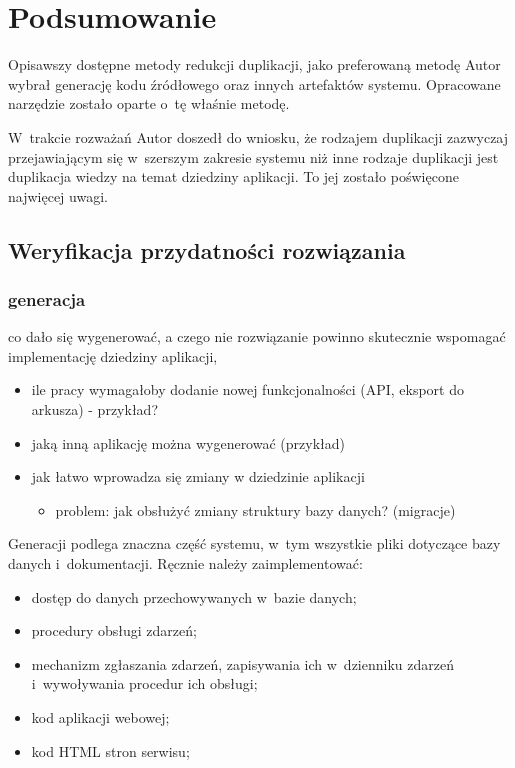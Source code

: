 \chapter{Podsumowanie} \label{chap:outro}

Opisawszy dostępne metody redukcji duplikacji, jako preferowaną metodę Autor wybrał generację kodu źródłowego oraz innych artefaktów systemu.
Opracowane narzędzie zostało oparte o~tę właśnie metodę.

W~trakcie rozważań Autor doszedł do wniosku, że rodzajem duplikacji zazwyczaj przejawiającym się w~szerszym zakresie systemu niż inne rodzaje duplikacji jest duplikacja wiedzy na temat dziedziny aplikacji.
To jej zostało poświęcone najwięcej uwagi.



\section{Weryfikacja przydatności rozwiązania}

\subsection{generacja}

co dało się wygenerować, a czego nie
rozwiązanie powinno skutecznie wspomagać implementację dziedziny aplikacji,

\begin{itemize}
 \item ile pracy wymagałoby dodanie nowej funkcjonalności (API, eksport do arkusza) - przykład?
 \item jaką inną aplikację można wygenerować (przykład)
 \item jak łatwo wprowadza się zmiany w dziedzinie aplikacji
  \begin{itemize}
   \item problem: jak obsłużyć zmiany struktury bazy danych? (migracje)
  \end{itemize}
\end{itemize}

Generacji podlega znaczna część systemu, w~tym wszystkie pliki dotyczące bazy danych i~dokumentacji.
Ręcznie należy zaimplementować:

\begin{itemize}
 \item dostęp do danych przechowywanych w~bazie danych;
 \item procedury obsługi zdarzeń;
 \item mechanizm zgłaszania zdarzeń, zapisywania ich w~dzienniku zdarzeń i~wywoływania procedur ich obsługi;
 \item kod aplikacji webowej;
 \item kod HTML stron serwisu;
\end{itemize}


